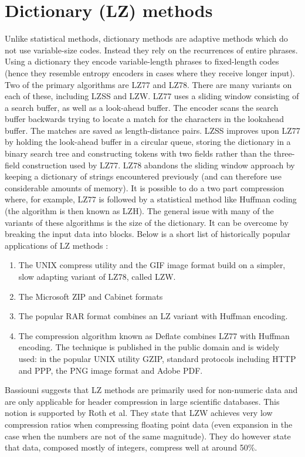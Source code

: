 \documentclass{acm_proc_article-sp}
\begin{document}
\section{Dictionary (LZ) methods}
Unlike statistical methods, dictionary methods are adaptive methods which do not use variable-size codes. Instead they rely on the recurrences of 
entire phrases. Using a dictionary they encode variable-length phrases to fixed-length codes (hence they resemble entropy encoders in cases where they receive longer input). Two of the primary 
algorithms are LZ77 and LZ78. There are many variants on each of these, including LZSS and LZW. LZ77 uses a sliding window consisting of a search buffer, as well as a look-ahead buffer. The encoder scans
the search buffer backwards trying to locate a match for the characters in the lookahead buffer. The matches are saved as length-distance pairs. LZSS improves upon LZ77 by holding the look-ahead buffer in a circular queue, storing the
dictionary in a binary search tree and constructing tokens with two fields rather than the three-field construction used by LZ77. LZ78 abandons the sliding window approach by keeping a dictionary of strings encountered previously (and can therefore 
use considerable amounts of memory). It is possible to do a two part compression where, for example, LZ77 is followed by a statistical method like Huffman coding (the algorithm is then known as
LZH). The general issue with many of the variants of these algorithms is the size of the dictionary. It can be overcome by breaking the input data into blocks. Below is a short list
of historically popular applications of LZ methods \cite[ch 3]{salomon2004data}:
\begin{enumerate}
 \item The UNIX compress utility and the GIF image format build on a simpler, slow adapting variant of LZ78, called LZW.
 \item The Microsoft ZIP and Cabinet formats
 \item The popular RAR format combines an LZ variant with Huffman encoding.
 \item The compression algorithm known as Deflate combines LZ77 with Huffman encoding. The technique is published in the public domain and is widely used: in the popular 
 UNIX utility GZIP, standard protocols including HTTP and PPP, the PNG image format and Adobe PDF.
\end{enumerate}

Bassiouni \cite{1701920} suggests that LZ methods are primarily used for non-numeric data and are only applicable for header compression in large scientific databases. This notion
is supported by Roth et al. \cite{Roth:1993:DC:163090.163096} They state that LZW achieves very low compression ratios when compressing floating point data (even expansion in the case when the numbers are not 
of the same magnitude). They do however state that data, composed mostly of integers, compress well at around 50\%.
\end{document}

